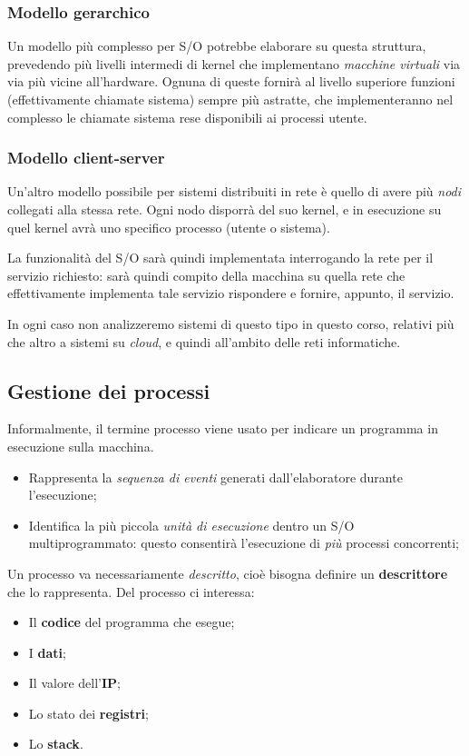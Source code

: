 \documentclass[a4paper,11pt]{article}
\begin{document}
\subsubsection{Modello gerarchico}
Un modello più complesso per S/O potrebbe elaborare su questa struttura, prevedendo più livelli intermedi di kernel che implementano \textit{macchine virtuali} via via più vicine all'hardware.
Ognuna di queste fornirà al livello superiore funzioni (effettivamente chiamate sistema) sempre più astratte, che implementeranno nel complesso le chiamate sistema rese disponibili ai processi utente.

\subsubsection{Modello client-server}
Un'altro modello possibile per sistemi distribuiti in rete è quello di avere più \textit{nodi} collegati alla stessa rete.
Ogni nodo disporrà del suo kernel, e in esecuzione su quel kernel avrà uno specifico processo (utente o sistema).

La funzionalità del S/O sarà quindi implementata interrogando la rete per il servizio richiesto: sarà quindi compito della macchina su quella rete che effettivamente implementa tale servizio rispondere e fornire, appunto, il servizio.

In ogni caso non analizzeremo sistemi di questo tipo in questo corso, relativi più che altro a sistemi su \textit{cloud}, e quindi all'ambito delle reti informatiche.

\subsection{Gestione dei processi}
Informalmente, il termine processo viene usato per indicare un programma in esecuzione sulla macchina.

\begin{itemize}
	\item Rappresenta la \textit{sequenza di eventi} generati dall'elaboratore durante l'esecuzione;
	\item Identifica la più piccola \textit{unità di esecuzione} dentro un S/O multiprogrammato: questo consentirà l'esecuzione di \textit{più} processi concorrenti;
\end{itemize}

Un processo va necessariamente \textit{descritto}, cioè bisogna definire un \textbf{descrittore} che lo rappresenta.
Del processo ci interessa:
\begin{itemize}
	\item Il \textbf{codice} del programma che esegue;
	\item I \textbf{dati};
	\item Il valore dell'\textbf{IP};
	\item Lo stato dei \textbf{registri};
	\item Lo \textbf{stack}.
\end{itemize}
\end{document}
